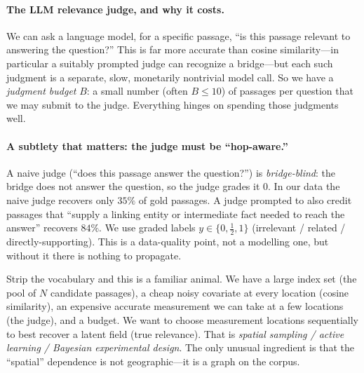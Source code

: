 \documentclass[11pt]{article}
\theoremstyle{plain}
\theoremstyle{definition}
\theoremstyle{remark}
\begin{document}
\paragraph{The LLM relevance judge, and why it costs.} We can ask a language model, for a specific passage, ``is
this passage relevant to answering the question?'' This is far more accurate than cosine similarity---in particular
a suitably prompted judge can recognize a bridge---but each such judgment is a separate, slow, monetarily nontrivial
model call. So we have a \emph{judgment budget} $B$: a small number (often $B\le 10$) of passages per question that
we may submit to the judge. Everything hinges on spending those judgments well.

\paragraph{A subtlety that matters: the judge must be ``hop-aware.''} A naive judge (``does this passage answer the
question?'') is \emph{bridge-blind}: the bridge does not answer the question, so the judge grades it $0$. In our
data the naive judge recovers only $35\%$ of gold passages. A judge prompted to also credit passages that ``supply
a linking entity or intermediate fact needed to reach the answer'' recovers $84\%$. We use graded labels
$y\in\{0,\tfrac12,1\}$ (irrelevant / related / directly-supporting). This is a data-quality point, not a modelling
one, but without it there is nothing to propagate.

\begin{stats}
Strip the vocabulary and this is a familiar animal. We have a large index set (the pool of $N$ candidate passages),
a cheap noisy covariate at every location (cosine similarity), an expensive accurate measurement we can take at a
few locations (the judge), and a budget. We want to choose measurement locations sequentially to best recover a
latent field (true relevance). That is \emph{spatial sampling / active learning / Bayesian experimental design}.
The only unusual ingredient is that the ``spatial'' dependence is not geographic---it is a graph on the corpus.
\end{stats}
\end{document}
